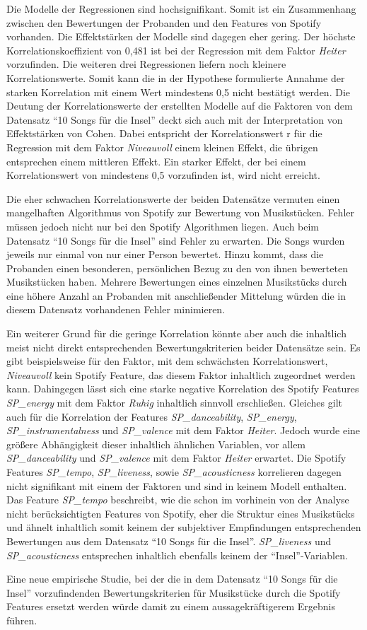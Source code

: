 Die Modelle der Regressionen sind hochsignifikant.
Somit ist ein Zusammenhang zwischen den Bewertungen der Probanden und den Features von Spotify vorhanden.
Die Effektstärken der Modelle sind dagegen eher gering. 
Der höchste Korrelationskoeffizient von 0,481 ist bei der Regression mit dem Faktor \textit{Heiter} vorzufinden. Die weiteren drei Regressionen liefern noch kleinere Korrelationswerte.
Somit kann die in der Hypothese formulierte Annahme der starken Korrelation mit einem Wert mindestens 0,5 nicht bestätigt werden. 
Die Deutung der Korrelationswerte der erstellten Modelle auf die Faktoren von dem Datensatz ``10 Songs für die Insel'' deckt sich auch mit der Interpretation von Effektstärken von Cohen.
Dabei entspricht der Korrelationswert r für die Regression mit dem Faktor \textit{Niveauvoll} einem kleinen Effekt, die übrigen entsprechen einem mittleren Effekt. Ein starker Effekt, der bei einem Korrelationswert von mindestens 0,5 vorzufinden ist, wird nicht erreicht.

Die eher schwachen Korrelationswerte der beiden Datensätze vermuten einen mangelhaften Algorithmus von Spotify zur Bewertung von Musikstücken.
Fehler müssen jedoch nicht nur bei den Spotify Algorithmen liegen.
Auch beim Datensatz ``10 Songs für die Insel'' sind Fehler zu erwarten.
Die Songs wurden jeweils nur einmal von nur einer Person bewertet.
Hinzu kommt, dass die Probanden einen besonderen, persönlichen Bezug zu den von ihnen bewerteten Musikstücken haben.
Mehrere Bewertungen eines einzelnen Musikstücks durch eine höhere Anzahl an Probanden mit anschließender Mittelung würden die in diesem Datensatz vorhandenen Fehler minimieren.

Ein weiterer Grund für die geringe Korrelation könnte aber auch die inhaltlich meist nicht direkt entsprechenden Bewertungskriterien beider Datensätze sein.
Es gibt beispielsweise für den Faktor, mit dem schwächsten Korrelationswert, \textit{Niveauvoll} kein Spotify Feature, das diesem Faktor inhaltlich zugeordnet werden kann.
Dahingegen lässt sich eine starke negative Korrelation des Spotify Features \textit{SP\_energy} mit dem Faktor \textit{Ruhig} inhaltlich sinnvoll erschließen.
Gleiches gilt auch für die Korrelation der Features \textit{SP\_danceability}, \textit{SP\_energy}, \textit{SP\_instrumentalness} und \textit{SP\_valence} mit dem Faktor \textit{Heiter}.
Jedoch wurde eine größere Abhängigkeit dieser inhaltlich ähnlichen Variablen, vor allem \textit{SP\_danceability} und \textit{SP\_valence} mit dem Faktor \textit{Heiter} erwartet.
Die Spotify Features \textit{SP\_tempo}, \textit{SP\_liveness}, sowie \textit{SP\_acousticness} korrelieren dagegen nicht signifikant mit einem der Faktoren und sind in keinem Modell enthalten. 
Das Feature \textit{SP\_tempo} beschreibt, wie die schon im vorhinein von der Analyse nicht berücksichtigten Features von Spotify, eher die Struktur eines Musikstücks und ähnelt inhaltlich somit keinem der subjektiver Empfindungen entsprechenden Bewertungen aus dem Datensatz ``10 Songs für die Insel''.
\textit{SP\_liveness} und \textit{SP\_acousticness} entsprechen inhaltlich ebenfalls keinem der ``Insel''-Variablen.  

Eine neue empirische Studie, bei der die in dem Datensatz ``10 Songs für die Insel'' vorzufindenden Bewertungskriterien für Musikstücke durch die Spotify Features ersetzt werden würde damit zu einem aussagekräftigerem Ergebnis führen.



